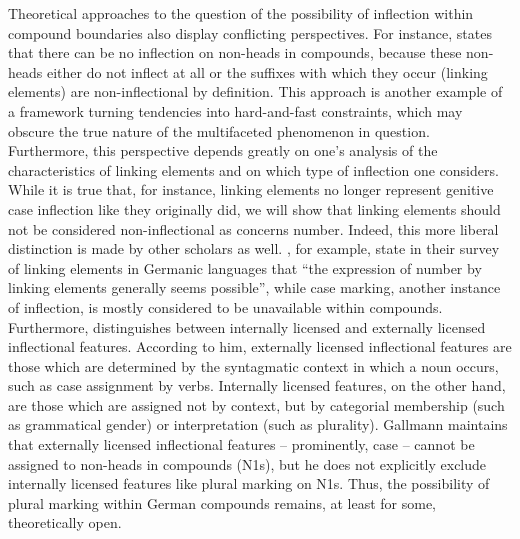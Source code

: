 Theoretical approaches to the question of the possibility of inflection within compound boundaries also display conflicting perspectives.
For instance, \textcite[9]{Schluecker2012} states that there can be no inflection on non-heads in compounds, because these non-heads either do not inflect at all or the suffixes with which they occur (\ie linking elements) are non-inflectional by definition.
This approach is another example of a framework turning tendencies into hard-and-fast constraints, which may obscure the true nature of the multifaceted phenomenon in question.
Furthermore, this perspective depends greatly on one's analysis of the characteristics of linking elements and on which type of inflection one considers.
While it is true that, for instance, linking elements no longer represent genitive case inflection like they originally did, we will show that linking elements should not be considered non-inflectional as concerns number.
Indeed, this more liberal distinction is made by other scholars as well.
\textcite[577]{FuhrhopKuerschner2015}, for example, state in their survey of linking elements in Germanic languages that ``the expression of number by linking elements generally seems possible'', while case marking, another instance of inflection, is mostly considered to be unavailable within compounds.
Furthermore, \textcite[178--180]{Gallmann1998} distinguishes between internally licensed and externally licensed inflectional features.
According to him, externally licensed inflectional features are those which are determined by the syntagmatic context in which a noun occurs, such as case assignment by verbs.
Internally licensed features, on the other hand, are those which are assigned not by context, but by categorial membership (such as grammatical gender) or interpretation (such as plurality).%
Gallmann maintains that externally licensed inflectional features -- prominently, case -- cannot be assigned to non-heads in compounds (N1s), but he does not explicitly exclude internally licensed features like plural marking on N1s.
Thus, the possibility of plural marking within German compounds remains, at least for some, theoretically open.

